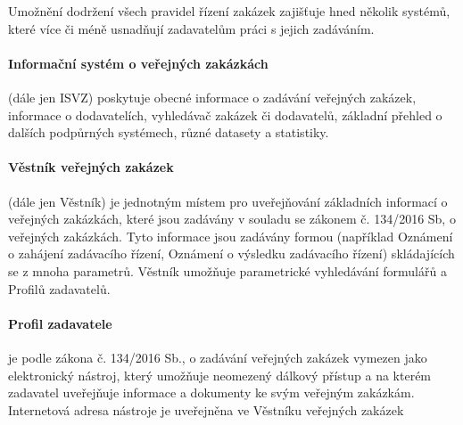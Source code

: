 \documentclass[thesis=M,czech]{FITthesis}[2019/12/23]
\begin{document}
Umožnění dodržení všech pravidel řízení zakázek zajišťuje hned několik systémů, které více či méně usnadňují zadavatelům práci s jejich zadáváním.

\paragraph{Informační systém o veřejných zakázkách}
(dále jen ISVZ) poskytuje obecné informace o zadávání veřejných zakázek, informace o dodavatelích, vyhledávač zakázek či dodavatelů, základní přehled o dalších podpůrných systémech, různé datasety a statistiky.

\paragraph{Věstník veřejných zakázek}
(dále jen Věstník) je jednotným místem pro uveřejňování základních informací o veřejných zakázkách, které jsou zadávány v souladu se zákonem č. 134/2016 Sb, o veřejných zakázkách. Tyto informace jsou zadávány formou  (například Oznámení o zahájení zadávacího řízení, Oznámení o výsledku zadávacího řízení) skládajících se z mnoha parametrů.
Věstník umožňuje parametrické vyhledávání formulářů a Profilů zadavatelů. 

\paragraph{Profil zadavatele} je podle zákona č. 134/2016 Sb., o zadávání veřejných zakázek vymezen jako elektronický nástroj, který umožňuje neomezený dálkový přístup a na kterém zadavatel uveřejňuje informace a dokumenty ke svým veřejným zakázkám. Internetová adresa nástroje je uveřejněna ve Věstníku veřejných zakázek

\end{document}
